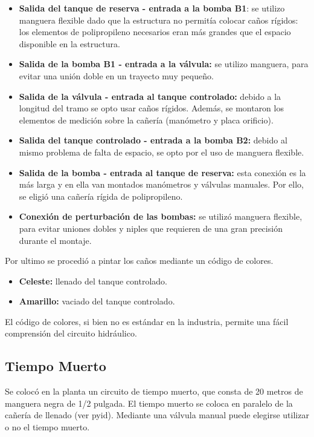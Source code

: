 \begin{itemize}
  \item \textbf{Salida del tanque de reserva - entrada a la bomba B1}:
  se utilizo manguera flexible dado que la estructura no permitía colocar caños
  rígidos: los elementos de polipropileno necesarios eran más grandes que el
  espacio disponible en la estructura.

  \item \textbf{Salida de la bomba B1 - entrada a la válvula:}
  se utilizo manguera, para evitar una unión doble en un trayecto muy pequeño.
  
  \item \textbf{Salida de la válvula - entrada al tanque controlado:}
  debido a la longitud del tramo se opto usar caños rígidos.
  Además, se montaron los elementos de medición sobre la cañería (manómetro y
  placa orificio).
  
  \item \textbf{Salida del tanque controlado - entrada a la bomba B2:}
  debido al mismo problema de falta de espacio, se opto por el uso de manguera
  flexible.
  
  \item \textbf{Salida de la bomba - entrada al tanque de reserva:}
  esta conexión es la más larga y en ella van montados manómetros y
  válvulas manuales. Por ello, se eligió una cañería rígida de polipropileno.

  \item \textbf{Conexión de perturbación de las bombas:}
  se utilizó manguera flexible, para evitar uniones dobles y
  niples que requieren de una gran precisión durante el montaje.
 \end{itemize}

Por ultimo se procedió a pintar los caños mediante un código de colores.
 \begin{itemize}
  \item {\color{Cerulean} \textbf{Celeste:}} llenado del tanque controlado.
  \item {\color{YellowOrange} \textbf{Amarillo:}} vaciado del tanque controlado.
 \end{itemize}
El código de colores, si bien no es estándar en la industria, permite una fácil
comprensión del circuito hidráulico.

\subsection{Tiempo Muerto}
\label{subsec:tiempoMuerto}
Se colocó en la planta un circuito de tiempo muerto, que consta de 20  metros de manguera negra de 1/2 pulgada.
El tiempo muerto se coloca en paralelo de la cañería de llenado (ver
\gls{pyid}).
Mediante una válvula manual puede elegirse utilizar o no el tiempo muerto.

